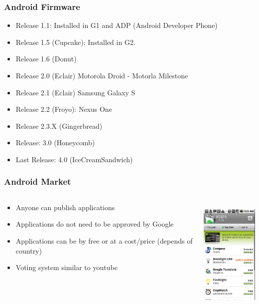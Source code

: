 \documentclass{beamer}
\begin{document}
\begin {frame}
\frametitle{Android Firmware}

\begin{itemize}
\item Release 1.1: Installed in G1 and ADP (Android Developer Phone)
\item Release 1.5 (Cupcake); Installed in G2.
\item Release 1.6 (Donut)
\item Release 2.0 (Eclair) Motorola Droid - Motorla Milestone
\item Release 2.1 (Eclair) Samsung Galaxy S
\item Release 2.2 (Froyo): Nexus One
\item Release 2.3.X (Gingerbread)
\item Release: 3.0 (Honeycomb)
\item Last Release: 4.0 (IceCreamSandwich)
\end{itemize}

\begin{center}
\end{center}

\end{frame}


\begin{frame}
\frametitle{Android Market}

\begin{columns}
\begin{column}{0.6\textwidth}
\begin{itemize}
\item Anyone can publish applications
\item Applications do not need to be approved by Google
\item Applications can be by free or at a cost/price (depends of country)
\item Voting system similar to youtube
\end{itemize}
\end{column}

\begin{column}{0.4\textwidth}
\begin{center}
  \includegraphics[height=5.5cm]{figs/android-market}
\end{center}

\end{column}
\end{columns}
\end{frame}
\end{document}

